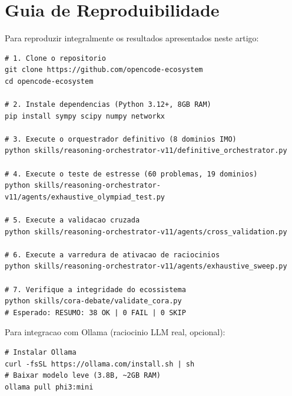 \documentclass[5p]{elsarticle}
\begin{document}
\section{Guia de Reproduibilidade}

Para reproduzir integralmente os resultados apresentados neste artigo:

\begin{Verbatim}[fontsize=\footnotesize,frame=single]
# 1. Clone o repositorio
git clone https://github.com/opencode-ecosystem
cd opencode-ecosystem

# 2. Instale dependencias (Python 3.12+, 8GB RAM)
pip install sympy scipy numpy networkx

# 3. Execute o orquestrador definitivo (8 dominios IMO)
python skills/reasoning-orchestrator-v11/definitive_orchestrator.py

# 4. Execute o teste de estresse (60 problemas, 19 dominios)
python skills/reasoning-orchestrator-v11/agents/exhaustive_olympiad_test.py

# 5. Execute a validacao cruzada
python skills/reasoning-orchestrator-v11/agents/cross_validation.py

# 6. Execute a varredura de ativacao de raciocinios
python skills/reasoning-orchestrator-v11/agents/exhaustive_sweep.py

# 7. Verifique a integridade do ecossistema
python skills/cora-debate/validate_cora.py
# Esperado: RESUMO: 38 OK | 0 FAIL | 0 SKIP
\end{Verbatim}

Para integracao com Ollama (raciocinio LLM real, opcional):
\begin{Verbatim}[fontsize=\footnotesize,frame=single]
# Instalar Ollama
curl -fsSL https://ollama.com/install.sh | sh
# Baixar modelo leve (3.8B, ~2GB RAM)
ollama pull phi3:mini
\end{Verbatim}
\end{document}
